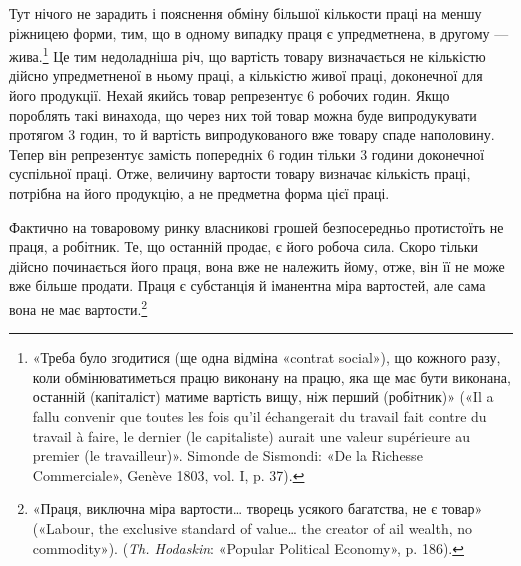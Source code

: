 Тут нічого не зарадить і пояснення обміну більшої кількости
праці на меншу ріжницею форми, тим, що в одному випадку праця
є упредметнена, в другому — жива.\footnote{
«Треба було згодитися (ще одна відміна «contrat social»), що кожного
разу, коли обмінюватиметься працю виконану на працю, яка ще
має бути виконана, останній (капіталіст) матиме вартість вищу, ніж перший
(робітник)» («Il a fallu convenir que toutes les fois qu’il échangerait du
travail fait contre du travail à faire, le dernier (le capitaliste) aurait une valeur
supérieure au premier (le travailleur)». Simonde de Sismondi: «De
la Richesse Commerciale», Genève 1803, vol. I, p. 37).
} Це тим недоладніша річ,
що вартість товару визначається не кількістю дійсно упредметненої
в ньому праці, а кількістю живої праці, доконечної для
його продукції. Нехай якийсь товар репрезентує 6 робочих годин.
Якщо пороблять такі винахода, що через них той товар можна
буде випродукувати протягом 3 годин, то й вартість випродукованого
вже товару спаде наполовину. Тепер він репрезентує
замість попередніх 6 годин тільки 3 години доконечної суспільної
праці. Отже, величину вартости товару визначає кількість праці,
потрібна на його продукцію, а не предметна форма цієї праці.

Фактично на товаровому ринку власникові грошей безпосередньо
протистоїть не праця, а робітник. Те, що останній продає,
є його робоча сила. Скоро тільки дійсно починається його
праця, вона вже не належить йому, отже, він її не може вже
більше продати. Праця є субстанція й іманентна міра вартостей,
але сама вона не має вартости.\footnote{
«Праця, виключна міра вартости\dots{} творець усякого багатства,
не є товар» («Labour, the exclusive standard of value\dots{} the creator of
ail wealth, no commodity»). (\emph{Th. Hodaskin}: «Popular Political Economy»,
p. 186).
}

